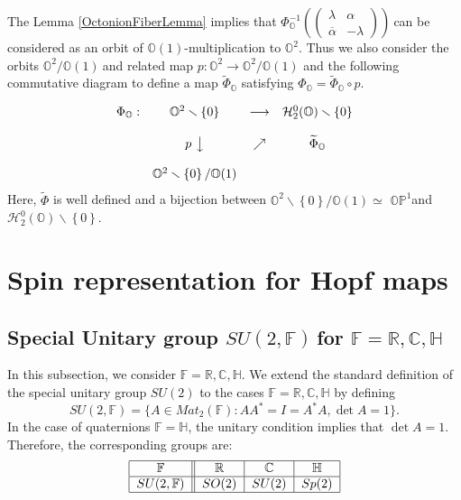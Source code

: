 \documentclass[a4paper]{article}%
\begin{document}
The Lemma \ref{OctonionFiberLemma} implies that $\Phi_{\mathbb{O}}^{-1}\left(
%
\begin{pmatrix}
\lambda & \alpha\\
\overline{\alpha} & -\lambda
\end{pmatrix}
\right)  \ $can be considered as an orbit of $\mathbb{O}(1)$-multiplication to
$\mathbb{O}^{2}$. Thus we also consider the orbits $\mathbb{O}^{2}%
/\mathbb{O}(1)\ $and related map $p:\mathbb{O}^{2}\rightarrow\mathbb{O}%
^{2}/\mathbb{O}(1)$ and the following commutative diagram to define a map
$\widetilde{\Phi}_{\mathbb{O}}$ satisfying $\Phi_{\mathbb{O}}=\widetilde{\Phi
}_{\mathbb{O}}\circ p$.%

\[%
\begin{matrix}
\Phi_{\mathbb{O}}: & \mathbb{O}^{2}\smallsetminus\left\{  0\right\}  &
\longrightarrow & \mathcal{H}_{2}^{0}(\mathbb{O})\smallsetminus\left\{
0\right\} \\
&  &  & \\
& p\ \big\downarrow & \nearrow & \widetilde{\Phi}_{\mathbb{O}}\\
&  &  & \\
& \mathbb{O}^{2}\smallsetminus\left\{  0\right\}  /\mathbb{O}(1) &  &
\end{matrix}
\]
Here, $\widetilde{\Phi}$ is well defined and a bijection between
$\mathbb{O}^{2}\smallsetminus\left\{  0\right\}  /\mathbb{O}(1)\simeq$
$\mathbb{OP}^{1}$and $\mathcal{H}_{2}^{0}(\mathbb{O})\smallsetminus\left\{
0\right\}  $.

\bigskip

\section{Spin representation for Hopf maps}

\subsection{Special Unitary group $SU(2,\mathbb{F})\ $for $\mathbb{F}%
=\mathbb{R},\mathbb{C},\mathbb{H}$}

In this subsection, we consider $\mathbb{F}=\mathbb{R},\mathbb{C},\mathbb{H}$.
We extend the standard definition of the special unitary group $SU(2)$ to the
cases $\mathbb{F}=\mathbb{R},\mathbb{C},\mathbb{H}$ by defining
\[
SU(2,\mathbb{F})=\{A\in Mat_{2}(\mathbb{F}):AA^{\ast}=I=A^{\ast}A,\det A=1\}.
\]
In the case of quaternions $\mathbb{F}=\mathbb{H}$, the unitary condition
implies that $\det A=1$. Therefore, the corresponding groups are:
\[%
\begin{tabular}
[c]{|c||c|c|c|}\hline
$\mathbb{F}$ & $\mathbb{R}$ & $\mathbb{C}$ & $\mathbb{H}$\\\hline
$SU(2,\mathbb{F})$ & $SO(2)$ & $SU(2)$ & $Sp(2)$\\\hline
\end{tabular}
\]
\end{document}
